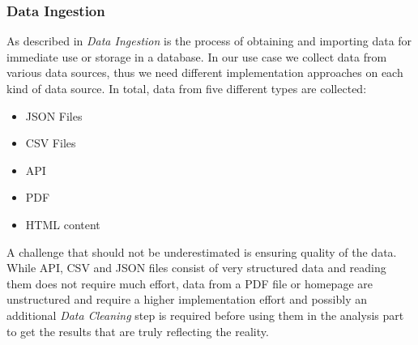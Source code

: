 \subsubsection{Data Ingestion}
\label{subsubsec:ingestion}
As described in \cite{ingestion} \textit{Data Ingestion} is the process of obtaining and importing data for immediate use or storage in a database. In our use case we collect data from various data sources, thus we need different implementation approaches on each kind of data source. \newline
In total, data from five different types are collected:
\begin{itemize}
  \item \ac{JSON} Files
  \item \ac{CSV} Files
  \item \ac{API}
  \item \acs{PDF}
  \item \acs{HTML} content
\end{itemize}
A challenge that should not be underestimated is ensuring quality of the data.
While \ac{API}, \ac{CSV} and \ac{JSON} files consist of very structured data and reading them does not require much effort,
data from a \ac{PDF} file or homepage are unstructured and require a higher implementation effort and possibly an additional
\textit{Data Cleaning} step is required before using them in the analysis part to get the results that are truly reflecting the reality.
%
